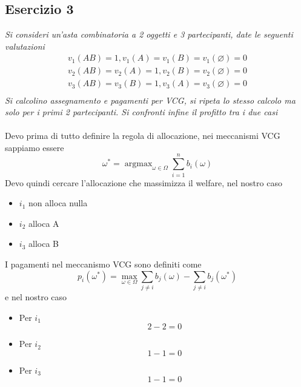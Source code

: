 \documentclass{article}
\DeclareMathOperator*{\argmax}{argmax}
\begin{document}
        \subsection{Esercizio 3}
            \textit{Si consideri un'asta combinatoria a 2 oggetti e 3 partecipanti, date le seguenti valutazioni}
            \[
                \begin{gathered}
                    v_1(AB) = 1, v_1(A) = v_1(B) = v_1(\varnothing) = 0\\   
                    v_2(AB) = v_2(A) = 1, v_2(B) = v_2(\varnothing) = 0\\
                    v_3(AB) = v_3(B) = 1, v_3(A) = v_3(\varnothing) = 0\\
                \end{gathered}
            \]
            \textit{Si calcolino assegnamento e pagamenti per VCG, si ripeta lo stesso calcolo ma solo per i primi 2 partecipanti. Si confronti infine il profitto tra i due casi}\\
            \\
            Devo prima di tutto definire la regola di allocazione, nei meccanismi VCG sappiamo essere
            \[
                \omega^* = \argmax_{\omega \in \Omega} \sum_{i=1}^{n} b_i(\omega)    
            \]
            Devo quindi cercare l'allocazione che massimizza il welfare, nel nostro caso
            \begin{itemize}
                \item $ i_1 $ non alloca nulla
                \item $ i_2 $ alloca A
                \item $ i_3 $ alloca B
            \end{itemize}
            I pagamenti nel meccanismo VCG sono definiti come
            \[
                p_i(\omega^*) = \max_{\omega \in \Omega} \sum_{j \neq i} b_j(\omega) - \sum_{j \neq i} b_j(\omega^*)
            \]
            e nel nostro caso
            \begin{itemize}
                \item Per $ i_1 $
                      \[
                        2 - 2 = 0    
                      \]
                \item Per $ i_2 $
                      \[
                        1 - 1 = 0   
                      \]
                \item Per $ i_3 $
                      \[
                        1 - 1 = 0    
                      \]
            \end{itemize}
\end{document}

